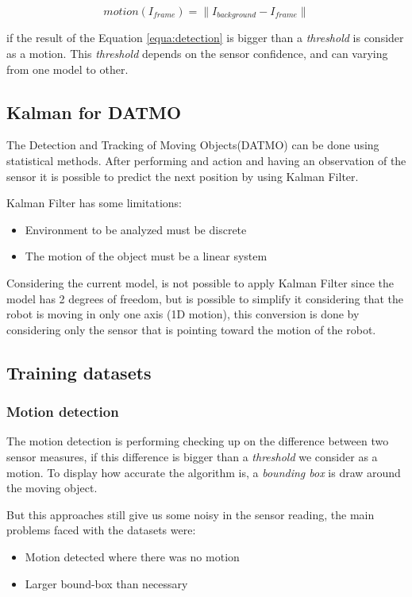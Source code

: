 \documentclass{article}
\begin{document}
\begin{equation}
motion(I_{frame})=\parallel I_{background}-I_{frame} \parallel
\label{equa:detection}
\end{equation}

if the result of the Equation \ref{equa:detection} is bigger than a \emph{threshold} is consider as a motion. This \emph{threshold} depends on the sensor confidence, and can varying from one model to other. 

\subsection{Kalman for DATMO}
The Detection and Tracking of Moving Objects(DATMO) can be done using statistical methods. After performing and action and having an observation of the sensor it is possible to predict the next position by using Kalman Filter. 

Kalman Filter has some limitations:
\begin{itemize}
\item Environment to be analyzed must be discrete
\item The motion of the object must be a linear system
\end{itemize}

Considering the current model, is not possible to apply Kalman Filter since the model has 2 degrees of freedom, but is possible to simplify it considering that the robot is moving in only one axis (1D motion), this conversion is done by considering only the sensor that is pointing toward the motion of the robot.

\subsection{Training datasets}

\subsubsection{Motion detection}

The motion detection is performing checking up on the difference between two sensor measures, if this difference is bigger than a \emph{threshold} we consider as a motion. To display how accurate the algorithm is, a \textit{bounding box} is draw around the moving object.

But this approaches still give us some noisy in the sensor reading, the main problems faced with the datasets were:
\begin{itemize}
\item Motion detected where there was no motion
\item Larger bound-box than necessary
\end{itemize}
\end{document}
